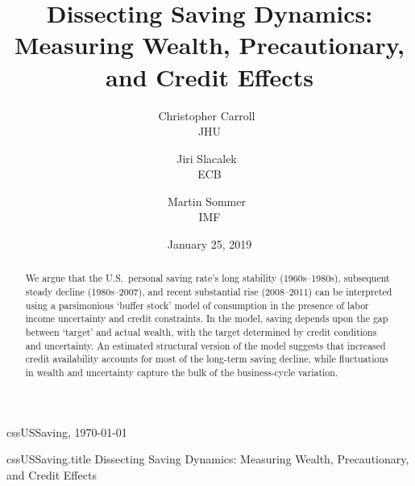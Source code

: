 \documentclass[titlepage]{\econtex}
\providecommand{\texname}{cssUSSaving}%
\begin{document}

\hfill{\tiny \texname, \today}

\begin{verbatimwrite}{\texname.title}
Dissecting Saving Dynamics: Measuring Wealth, Precautionary, and Credit Effects
\end{verbatimwrite}

\title{Dissecting Saving Dynamics: Measuring Wealth, Precautionary, and Credit Effects  }

\medskip\medskip

\author{
{Christopher Carroll\tiny{~}}\authNum \\ {\small JHU}
\and
{Jiri Slacalek\tiny{~}}\authNum \\ {\small ECB}
\and
{Martin Sommer\tiny{~}}\authNum \\ {\small IMF}
}

\date{January 25, 2019}

\maketitle




\begin{abstract}
  We argue that the U.S.\
  personal saving rate's long stability (1960s--1980s), subsequent
  steady decline (1980s--2007), and recent substantial rise
  (2008--2011) can be interpreted using a parsimonious `buffer stock'
  model of consumption in the presence of labor income uncertainty and
  credit constraints. In the model, saving depends upon the gap
  between `target' and actual wealth, with the target determined by
  credit conditions and uncertainty.  An estimated structural version
  of the model suggests that increased credit availability accounts
  for most of the long-term saving decline, while fluctuations in
  wealth and uncertainty capture the bulk of the business-cycle
  variation.
\end{abstract}
\end{document}

